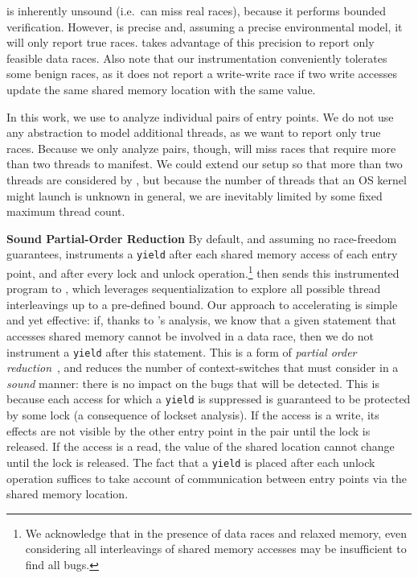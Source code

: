 \corral is inherently unsound (i.e.\ can miss real races), because it performs bounded verification. However, \corral is precise and, assuming a precise environmental model, it will only report true races. \whoop takes advantage of this precision to report only feasible data races. Also note that our instrumentation conveniently tolerates some benign races, as it does not report a write-write race if two write accesses update the same shared memory location with the same value.

In this work, we use \corral to analyze individual pairs of entry points. We do not use any abstraction to model additional threads, as we want \corral to report only true races. Because we only analyze pairs, though, \corral will miss races that require more than two threads to manifest. We could extend our setup so that more than two threads are considered by \corral, but because the number of threads that an OS kernel might launch is unknown in general, we are inevitably limited by some fixed maximum thread count.

\noindent\textbf{Sound Partial-Order Reduction }
%
By default, and assuming no race-freedom guarantees, \whoop instruments a \texttt{yield} after each shared memory access of each entry point, and after every lock and unlock operation.\footnote{We acknowledge that in the presence of data races and relaxed memory, even considering all interleavings of shared memory accesses may be insufficient to find all bugs.} \whoop then sends this instrumented program to \corral, which leverages sequentialization to explore all possible thread interleavings up to a pre-defined bound. Our approach to accelerating \corral is simple and yet effective: if, thanks to \whoop's analysis, we know that a given statement that accesses shared memory cannot be involved in a data race, then we do not instrument a \texttt{yield} after this statement.  This is a form of \emph{partial order reduction}~\cite{DBLP:books/sp/Godefroid96}, and reduces the number of context-switches that \corral must consider in a \emph{sound} manner: there is no impact on the bugs that will be detected.  This is because each access for which a \texttt{yield} is suppressed is guaranteed to be protected by some lock (a consequence of lockset analysis).  If the access is a write, its effects are not visible by the other entry point in the pair until the lock is released.  If the access is a read, the value of the shared location cannot change until the lock is released.  The fact that a \texttt{yield} is placed after each unlock operation suffices to take account of communication between entry points via the shared memory location.

